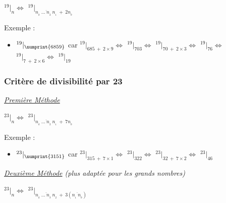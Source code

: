 \documentclass[a4paper]{article}
\begin{document}
\begin{center}
	\huge
	$ ^{19}|_n \Leftrightarrow$ $^{19}|_{\overline{n_{_{k}}~\dots~n_{_2}~n_{_1}}~+~2n_{_0}} $
\end{center}

{ \parindent=0.5cm Exemple : }

\begin{large}
\begin{itemize}

	\item[] $ ^{19}|_{\numprint{6859}}$ {\normalsize car} $^{19}|_{685~+~2\times9} \Leftrightarrow$ $^{19}|_{703} \Leftrightarrow$ $^{19}|_{70~+~2\times3} \Leftrightarrow$ $^{19}|_{76} \Leftrightarrow$ $^{19}|_{7~+~2\times6} \Leftrightarrow$ $^{19}|_{19}$\\

\end{itemize}
\end{large}


\vfill
{\noindent \dotfill}


\subsubsection*{Critère de divisibilité par 23}

{\noindent  \underline{\textit{Première Méthode}}}	

\begin{center}
	\huge
	$ ^{23}|_n \Leftrightarrow$ $^{23}|_{\overline{n_{_{k}}~\dots~n_{_2}~n_{_1}}~+~7n_{_0}} $
\end{center}

{ \parindent=0.5cm Exemple : }

\begin{Large}
\begin{itemize}

	\item[] $ ^{23}|_{\numprint{3151}}$ {\normalsize car} $^{23}|_{315~+~7\times1} \Leftrightarrow$ $^{23}|_{322} \Leftrightarrow$ $^{23}|_{32~+~7\times2} \Leftrightarrow$ $^{23}|_{46}$\\

\end{itemize}
\end{Large}





{\noindent  \textit{\underline{Deuxième Méthode} (plus adaptée pour les grands nombres)}}

\begin{center}
	\huge
	$ ^{23}|_n \Leftrightarrow$ $^{23}|_{\overline{n_{_{k}}~\dots~n_{_3}~n_{_2}}~+~3\left(\overline{n_{_1}~n_{_0}}\right)} $
\end{center}
\end{document}
